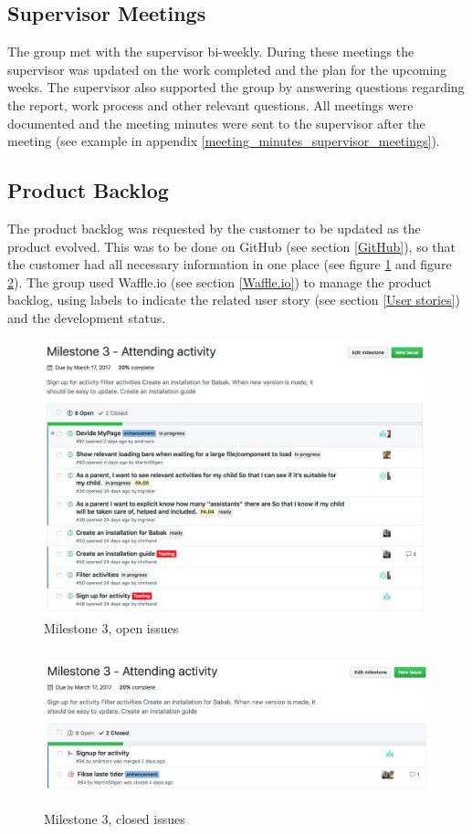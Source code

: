 \subsection{Supervisor Meetings}
The group met with the supervisor bi-weekly. During these meetings the supervisor was updated on the work completed and the plan for the upcoming weeks. The supervisor also supported the group by answering questions regarding the report, work process and other relevant questions. All meetings were documented and the meeting minutes were sent to the supervisor after the meeting (see example in appendix \ref{meeting_minutes_supervisor_meetings}).

\subsection{Product Backlog}
\label{product_backlog}
The product backlog was requested by the customer to be updated as the product evolved. This was to be done on GitHub (see section \ref{GitHub}), so that the customer had all necessary information in one place (see figure \ref{Open Issues} and figure \ref{Closed Issues}). The group used Waffle.io (see section \ref{Waffle.io}) to manage the product backlog, using labels to indicate the related user story (see section \ref{User stories}) and the development status.


\begin{figure}[ht]
\centering
    \includegraphics[width=\linewidth, height=80mm]{fig/open_issues}
\caption{Milestone 3, open issues}
\label{Open Issues}
\end{figure}

\begin{figure}[ht]
\centering
    \includegraphics[width=\linewidth, height=45mm]{fig/closed_issues}
\caption{Milestone 3, closed issues}
\label{Closed Issues}
\end{figure}

\cleardoublepage